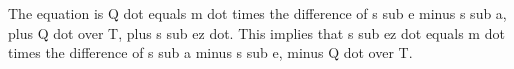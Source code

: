 The equation is Q dot equals m dot times the difference of s sub e minus s sub a, plus Q dot over T, plus s sub ez dot. This implies that s sub ez dot equals m dot times the difference of s sub a minus s sub e, minus Q dot over T.